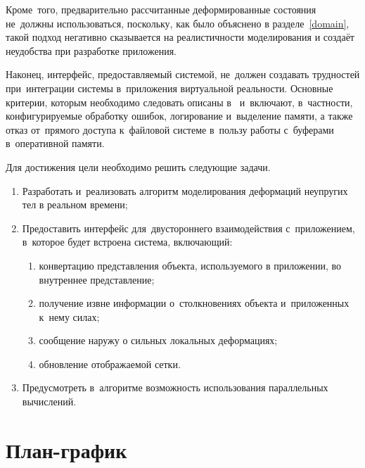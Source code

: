 \documentclass[a4paper,11pt]{report}
\begin{document}
    Кроме~того, предварительно рассчитанные деформированные состояния не~должны использоваться,
    поскольку, как было объяснено в разделе~\ref{domain}, такой подход негативно сказывается на реалистичности
    моделирования и создаёт неудобства при разработке приложения.

    Наконец, интерфейс, предоставляемый системой, не~должен создавать трудностей при~интеграции
    системы в~приложения виртуальной реальности. Основные критерии, которым необходимо следовать
    описаны в~\cite{gems-middleware} и~включают, в~частности, конфигурируемые обработку ошибок,
    логирование и~выделение памяти, а также отказ от~прямого доступа к~файловой системе в~пользу
    работы с~буферами в~оперативной памяти.

    Для достижения цели необходимо решить следующие задачи.
    \begin{enumerate}
      \item Разработать и~реализовать алгоритм моделирования деформаций неупругих тел в реальном времени;
      \item Предоставить интерфейс для~двустороннего взаимодействия с~приложением, в~которое будет
        встроена система, включающий:
        \begin{enumerate}
          \item конвертацию представления объекта, используемого в приложении, во внутреннее представление;
          \item получение извне информации о~столкновениях объекта и~приложенных к~нему силах;
          \item сообщение наружу о сильных локальных деформациях;
          \item обновление отображаемой сетки.
        \end{enumerate}
      \item Предусмотреть в~алгоритме возможность использования параллельных вычислений.
    \end{enumerate}

  \chapter{План-график}
\end{document}
